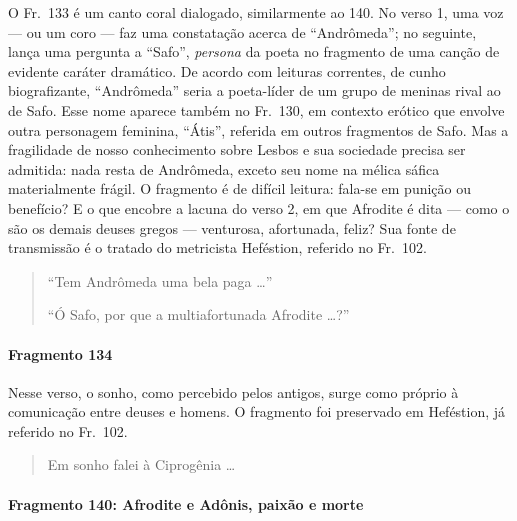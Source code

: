 {\small O Fr.~133 é um canto coral dialogado, similarmente ao 140. No verso 1, uma voz ---
ou um coro --- faz uma constatação acerca de ``Andrômeda”; no seguinte,
lança uma pergunta a ``Safo”, \textit{persona }da poeta no fragmento de
uma canção de evidente caráter dramático. De acordo com leituras correntes, de
cunho biografizante, ``Andrômeda” seria a poeta-líder de um grupo de
meninas rival ao de Safo. Esse nome aparece também no Fr.~130, em contexto
erótico que envolve outra personagem feminina, “Átis”, referida em
outros fragmentos de Safo. Mas a fragilidade de nosso conhecimento sobre Lesbos
e sua sociedade precisa ser admitida: nada resta de Andrômeda, exceto seu nome
na mélica sáfica materialmente frágil. O fragmento é de difícil leitura:
fala-se em punição ou benefício? E o que encobre a lacuna do verso 2, em que
Afrodite é dita --- como o são os demais deuses gregos --- venturosa, afortunada,
feliz? Sua fonte de transmissão é o tratado do metricista Heféstion, referido
no Fr.~102.}

\begin{verse}
“Tem Andrômeda uma bela paga \ldots{}”

“Ó Safo, por que a multiafortunada Afrodite \ldots{}?”
\end{verse}

\paragraph{Fragmento 134}

{\small Nesse verso, o sonho, como percebido pelos antigos, surge como próprio à
comunicação entre deuses e homens. O fragmento foi preservado em Heféstion, já
referido no Fr.~102.}

\begin{verse}
Em sonho falei à Ciprogênia \ldots{}
\end{verse}

\paragraph{Fragmento 140: Afrodite e Adônis, paixão e morte}

